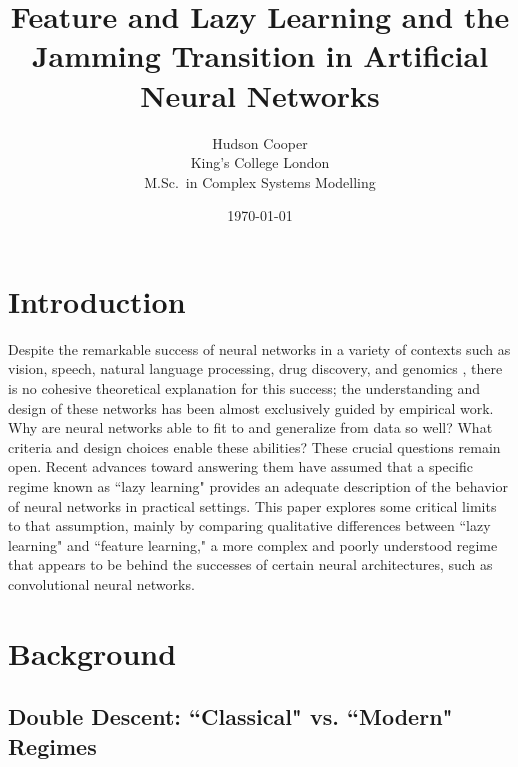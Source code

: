 \documentclass[a4paper, 11pt]{article}
\begin{document}
\title{\bf Feature and Lazy Learning and the Jamming Transition in Artificial Neural Networks}
\author{
    Hudson Cooper\\ %
    King's College London\\
    M.Sc.\ in Complex Systems Modelling
}
\date{\today}

\begin{titlingpage}
\maketitle
\begin{abstract}
\lipsum[1]
\end{abstract}
\end{titlingpage}

\tableofcontents

\section{Introduction}
Despite the remarkable success of neural networks in a variety of contexts such as vision, speech, natural language processing, drug discovery, and genomics \cite{lecunDeepLearning2015}, there is no cohesive theoretical explanation for this success; the understanding and design of these networks has been almost exclusively guided by empirical work. \\

Why are neural networks able to fit to and generalize from data so well? What criteria and design choices enable these abilities? These crucial questions remain open. Recent advances toward answering them have assumed that a specific regime known as ``lazy learning" provides an adequate description of the behavior of neural networks in practical settings. This paper explores some critical limits to that assumption, mainly by comparing qualitative differences between ``lazy learning" and ``feature learning," a more complex and poorly understood regime that appears to be behind the successes of certain neural architectures, such as convolutional neural networks. 

\section{Background}

\subsection{Double Descent: ``Classical" vs. ``Modern" Regimes}
\end{document}
